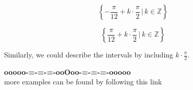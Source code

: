 \documentclass{ximera}
\begin{document}
\[
\left\{  -\frac{\pi}{12} + k  \cdot \frac{\pi}{2}  \, | \,  k \in \mathbb{Z}         \right\}
\]



\[
\left\{  \frac{\pi}{12} + k  \cdot \frac{\pi}{2}  \, | \,  k \in \mathbb{Z}         \right\}
\]




Similarly, we could describe the intervals by including $k  \cdot \frac{\pi}{2} $. \\

















\begin{center}
\textbf{\textcolor{green!50!black}{ooooo-=-=-=-ooOoo-=-=-=-ooooo}} \\

more examples can be found by following this link\\ 

\end{center}
\end{document}
